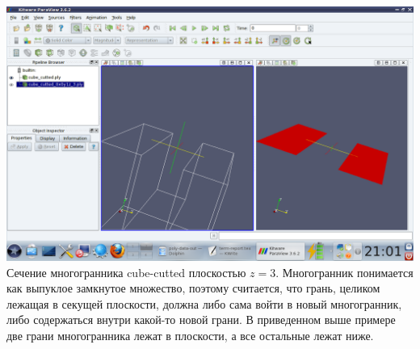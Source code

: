 \documentclass[a4paper,12pt, titlepage]{article}
\begin{document}
	\begin{flushleft}
		\includegraphics[trim = 220 65 10 140, clip, width=15cm]{cube-cutted/3.png}
		Сечение многогранника cube-cutted плоскостью $z = 3$. Многогранник понимается как выпуклое
		замкнутое множество, поэтому считается, что грань, целиком лежащая в секущей плоскости,
		должна либо сама войти в новый многогранник, либо содержаться внутри какой-то новой грани.
		В приведенном выше примере две грани многогранника лежат в плоскости, а все остальные лежат
		ниже.
	\end{flushleft}
\end{document}
